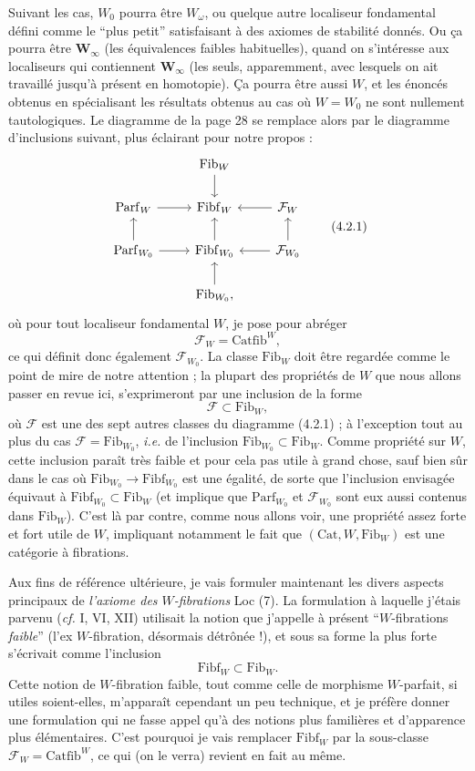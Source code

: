 \documentclass[11pt]{article}
\newcommand{\printedpage}[1]{\marginpar{\footnotesize p.~#1}}
\newcommand{\msp}[1]{\marginpar{\footnotesize [#1]}}
\newcommand{\Fib}{\mathrm{Fib}}
\newcommand{\Fibf}{\mathrm{Fibf}}
\newcommand{\Parf}{\mathrm{Parf}}
\newcommand{\Catfib}{\mathrm{Catfib}}
\newcommand{\Cat}{\mathrm{Cat}}
\begin{document}
Suivant les cas, $W_0$ pourra être $W_\omega$, ou quelque autre localiseur fondamental défini comme le “plus petit” satisfaisant à des axiomes de stabilité donnés. Ou ça pourra être $\mathbf{W}_\infty$ (les équivalences faibles habituelles), quand on s'intéresse aux localiseurs qui contiennent $\mathbf{W}_\infty$ (les seuls, apparemment, avec lesquels on ait travaillé jusqu'à présent en homotopie). Ça pourra être aussi $W$, et les énoncés obtenus en spécialisant les résultats obtenus au cas où $W = W_0$ ne sont nullement tautologiques. Le diagramme de la page 28 se remplace alors par le diagramme d'inclusions suivant, plus éclairant pour notre propos :
\[
\begin{tikzcd}
 & \Fib_W \arrow[d] & \\
\Parf_W \arrow[r] & \Fibf_W & \mathcal{F}_W \arrow[l] \\
\Parf_{W_0} \arrow[r] \arrow[u] & \Fibf_{W_0} \arrow[u] & \mathcal{F}_{W_0} \arrow[l] \arrow[u] \\
 & \Fib_{W_0}, \arrow[u] &
\end{tikzcd}
\tag*{(4.2.1)}
\]
où pour tout localiseur fondamental $W$, je pose pour abréger
\[
\mathcal{F}_W = \Catfib^W,
\]
ce qui définit donc également $\mathcal{F}_{W_0}$. La classe $\Fib_W$ \msp{page 31} doit être regardée comme le point de mire de notre attention ; la plupart des propriétés de $W$ que nous allons passer en revue ici, s'exprimeront par une inclusion de la forme
\[
\mathcal{F} \subset \Fib_W,
\]
où $\mathcal{F}$ est une des sept autres classes du diagramme (4.2.1) ; à l'exception tout au plus du cas $\mathcal{F} = \Fib_{W_0}$, \textit{i.e.} de l'inclusion $\Fib_{W_0} \subset \Fib_W$. Comme propriété sur $W$, cette inclusion paraît très faible et pour cela pas utile à grand chose, sauf bien sûr dans le cas où $\Fib_{W_0} \longrightarrow \Fibf_{W_0}$ est une égalité, de sorte que l'inclusion envisagée équivaut à $\Fibf_{W_0} \subset \Fib_W$ (et implique que $\Parf_{W_0}$ et $\mathcal{F}_{W_0}$ sont eux aussi contenus dans $\Fib_W$). C'est là par contre, comme nous allons voir, une propriété assez forte et fort utile de $W$, impliquant notamment le fait que $(\Cat, W, \Fib_W)$ est une catégorie à fibrations.

\printedpage{21}

\msp{page 32}

Aux fins de référence ultérieure, je vais formuler maintenant les divers aspects principaux de \textit{l'axiome des $W$-fibrations} Loc (7). La formulation à laquelle j'étais parvenu (\textit{cf.} I, VI, XII) utilisait la notion que j'appelle à présent “$W$-fibrations \textit{faible}” (l'ex $W$-fibration, désormais détrônée !), et sous sa forme la plus forte s'écrivait comme l'inclusion %
\[
\Fibf_W \subset \Fib_W.
\]
Cette notion de $W$-fibration faible, tout comme celle de morphisme $W$-parfait, si utiles soient-elles, m'apparaît cependant un peu technique, et je préfère donner une formulation qui ne fasse appel qu'à des notions plus familières et d'apparence plus élémentaires. C'est pourquoi je vais remplacer $\Fibf_W$ par la sous-classe $\mathcal{F}_W = \Catfib^W$, ce qui (on le verra) revient en fait au même.
\end{document}
